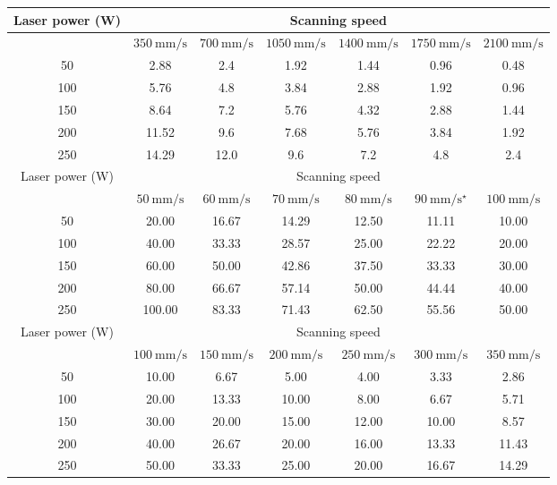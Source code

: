 \documentclass[10pt]{article}
\begin{document}
\begin{center}
\begin{tabular}{|c|c|c|c|c|c|c|}
\hline
\multirow[t]{2}{*}{Laser power (W)} & \multicolumn{6}{|c|}{Scanning speed} \\
\hline
 & $350 \mathrm{~mm} / \mathrm{s}$ & $700 \mathrm{~mm} / \mathrm{s}$ & $1050 \mathrm{~mm} / \mathrm{s}$ & $1400 \mathrm{~mm} / \mathrm{s}$ & $1750 \mathrm{~mm} / \mathrm{s}$ & $2100 \mathrm{~mm} / \mathrm{s}$ \\
\hline
50 & 2.88 & 2.4 & 1.92 & 1.44 & 0.96 & 0.48 \\
\hline
100 & 5.76 & 4.8 & 3.84 & 2.88 & 1.92 & 0.96 \\
\hline
150 & 8.64 & 7.2 & 5.76 & 4.32 & 2.88 & 1.44 \\
\hline
200 & 11.52 & 9.6 & 7.68 & 5.76 & 3.84 & 1.92 \\
\hline
250 & 14.29 & 12.0 & 9.6 & 7.2 & 4.8 & 2.4 \\
\hline
\multirow[t]{2}{*}{Laser power (W)} & \multicolumn{6}{|c|}{Scanning speed} \\
\hline
 & $50 \mathrm{~mm} / \mathrm{s}$ & $60 \mathrm{~mm} / \mathrm{s}$ & $70 \mathrm{~mm} / \mathrm{s}$ & $80 \mathrm{~mm} / \mathrm{s}$ & $90 \mathrm{~mm} / \mathrm{s}^{\star}$ & $100 \mathrm{~mm} / \mathrm{s}$ \\
\hline
50 & 20.00 & 16.67 & 14.29 & 12.50 & 11.11 & 10.00 \\
\hline
100 & 40.00 & 33.33 & 28.57 & 25.00 & 22.22 & 20.00 \\
\hline
150 & 60.00 & 50.00 & 42.86 & 37.50 & 33.33 & 30.00 \\
\hline
200 & 80.00 & 66.67 & 57.14 & 50.00 & 44.44 & 40.00 \\
\hline
250 & 100.00 & 83.33 & 71.43 & 62.50 & 55.56 & 50.00 \\
\hline
\multirow[t]{2}{*}{Laser power (W)} & \multicolumn{6}{|c|}{Scanning speed} \\
\hline
 & $100 \mathrm{~mm} / \mathrm{s}$ & $150 \mathrm{~mm} / \mathrm{s}$ & $200 \mathrm{~mm} / \mathrm{s}$ & $250 \mathrm{~mm} / \mathrm{s}$ & $300 \mathrm{~mm} / \mathrm{s}$ & $350 \mathrm{~mm} / \mathrm{s}$ \\
\hline
50 & 10.00 & 6.67 & 5.00 & 4.00 & 3.33 & 2.86 \\
\hline
100 & 20.00 & 13.33 & 10.00 & 8.00 & 6.67 & 5.71 \\
\hline
150 & 30.00 & 20.00 & 15.00 & 12.00 & 10.00 & 8.57 \\
\hline
200 & 40.00 & 26.67 & 20.00 & 16.00 & 13.33 & 11.43 \\
\hline
250 & 50.00 & 33.33 & 25.00 & 20.00 & 16.67 & 14.29 \\
\hline
\end{tabular}
\end{center}
\end{document}
